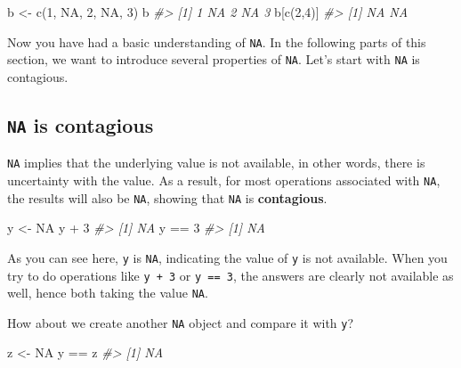 \documentclass[
]{book}
\newenvironment{Shaded}{\begin{snugshade}}{\end{snugshade}}
\newcommand{\CommentTok}[1]{\textcolor[rgb]{0.56,0.35,0.01}{\textit{#1}}}
\newcommand{\ConstantTok}[1]{\textcolor[rgb]{0.00,0.00,0.00}{#1}}
\newcommand{\DecValTok}[1]{\textcolor[rgb]{0.00,0.00,0.81}{#1}}
\newcommand{\FunctionTok}[1]{\textcolor[rgb]{0.00,0.00,0.00}{#1}}
\newcommand{\NormalTok}[1]{#1}
\newcommand{\OtherTok}[1]{\textcolor[rgb]{0.56,0.35,0.01}{#1}}
\newcommand{\SpecialCharTok}[1]{\textcolor[rgb]{0.00,0.00,0.00}{#1}}
\begin{document}
\begin{Shaded}
\begin{Highlighting}[]
\NormalTok{b }\OtherTok{\textless{}{-}} \FunctionTok{c}\NormalTok{(}\DecValTok{1}\NormalTok{, }\ConstantTok{NA}\NormalTok{, }\DecValTok{2}\NormalTok{, }\ConstantTok{NA}\NormalTok{, }\DecValTok{3}\NormalTok{)}
\NormalTok{b}
\CommentTok{\#\textgreater{} [1]  1 NA  2 NA  3}
\NormalTok{b[}\FunctionTok{c}\NormalTok{(}\DecValTok{2}\NormalTok{,}\DecValTok{4}\NormalTok{)]}
\CommentTok{\#\textgreater{} [1] NA NA}
\end{Highlighting}
\end{Shaded}

Now you have had a basic understanding of \texttt{NA}. In the following parts of this section, we want to introduce several properties of \texttt{NA}. Let's start with \texttt{NA} is contagious.

\hypertarget{na-is-contagious}{%
\subsection{\texorpdfstring{\texttt{NA} is contagious}{NA is contagious}}\label{na-is-contagious}}

\texttt{NA} implies that the underlying value is not available, in other words, there is uncertainty with the value. As a result, for most operations associated with \texttt{NA}, the results will also be \texttt{NA}, showing that \texttt{NA} is \textbf{contagious}.

\begin{Shaded}
\begin{Highlighting}[]
\NormalTok{y }\OtherTok{\textless{}{-}} \ConstantTok{NA}
\NormalTok{y }\SpecialCharTok{+} \DecValTok{3}
\CommentTok{\#\textgreater{} [1] NA}
\NormalTok{y }\SpecialCharTok{==} \DecValTok{3}
\CommentTok{\#\textgreater{} [1] NA}
\end{Highlighting}
\end{Shaded}

As you can see here, \texttt{y} is \texttt{NA}, indicating the value of \texttt{y} is not available. When you try to do operations like \texttt{y\ +\ 3} or \texttt{y\ ==\ 3}, the answers are clearly not available as well, hence both taking the value \texttt{NA}.

How about we create another \texttt{NA} object and compare it with \texttt{y}?

\begin{Shaded}
\begin{Highlighting}[]
\NormalTok{z }\OtherTok{\textless{}{-}} \ConstantTok{NA} 
\NormalTok{y }\SpecialCharTok{==}\NormalTok{ z }
\CommentTok{\#\textgreater{} [1] NA}
\end{Highlighting}
\end{Shaded}
\end{document}
